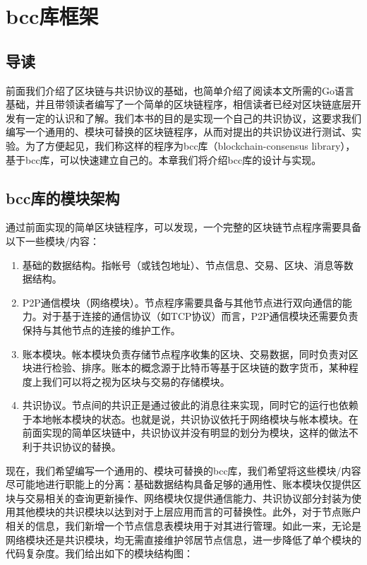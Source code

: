 \chapter{bcc库框架}

\section{导读}

前面我们介绍了区块链与共识协议的基础，也简单介绍了阅读本文所需的Go语言基础，并且带领读者编写了一个简单的区块链程序，相信读者已经对区块链底层开发有一定的认识和了解。我们本书的目的是实现一个自己的共识协议，这要求我们编写一个通用的、模块可替换的区块链程序，从而对提出的共识协议进行测试、实验。为了方便起见，我们称这样的程序为bcc库（blockchain-consensus library），基于bcc库，可以快速建立自己的。本章我们将介绍bcc库的设计与实现。

\section{bcc库的模块架构}

通过前面实现的简单区块链程序，可以发现，一个完整的区块链节点程序需要具备以下一些模块/内容：

\begin{enumerate}
    \item 基础的数据结构。指帐号（或钱包地址）、节点信息、交易、区块、消息等数据结构。
    \item P2P通信模块（网络模块）。节点程序需要具备与其他节点进行双向通信的能力。对于基于连接的通信协议（如TCP协议）而言，P2P通信模块还需要负责保持与其他节点的连接的维护工作。
    \item 账本模块。帐本模块负责存储节点程序收集的区块、交易数据，同时负责对区块进行检验、排序。账本的概念源于比特币等基于区块链的数字货币，某种程度上我们可以将之视为区块与交易的存储模块。
    \item 共识协议。节点间的共识正是通过彼此的消息往来实现，同时它的运行也依赖于本地帐本模块的状态。也就是说，共识协议依托于网络模块与帐本模块。在前面实现的简单区块链中，共识协议并没有明显的划分为模块，这样的做法不利于共识协议的替换。
\end{enumerate}

现在，我们希望编写一个通用的、模块可替换的bcc库，我们希望将这些模块/内容尽可能地进行职能上的分离：基础数据结构具备足够的通用性、账本模块仅提供区块与交易相关的查询更新操作、网络模块仅提供通信能力、共识协议部分封装为使用其他模块的共识模块以达到对于上层应用而言的可替换性。此外，对于节点账户相关的信息，我们新增一个节点信息表模块用于对其进行管理。如此一来，无论是网络模块还是共识模块，均无需直接维护邻居节点信息，进一步降低了单个模块的代码复杂度。我们给出如下的模块结构图：

